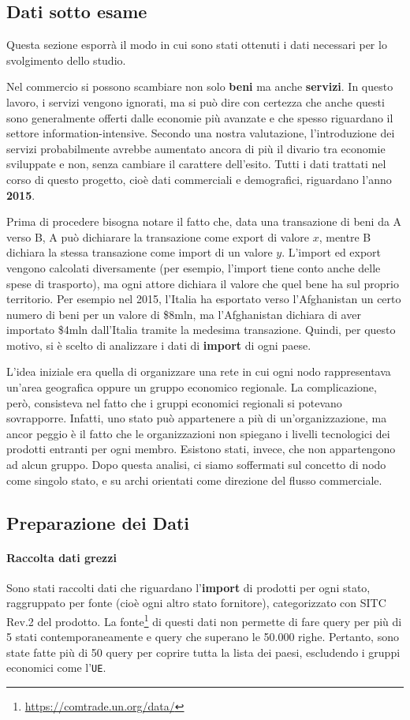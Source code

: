 \documentclass[]{article}
\begin{document}
\begin{multicols}{2}
	\section{Dati sotto esame}
	Questa sezione esporrà il modo in cui sono stati ottenuti i dati necessari per lo svolgimento dello studio.
	
	Nel commercio si possono scambiare non solo \textbf{beni} ma anche \textbf{servizi}. In questo lavoro, i servizi vengono ignorati, ma si può dire con certezza che anche questi sono generalmente offerti dalle economie più avanzate e che spesso riguardano il settore information-intensive. Secondo una nostra valutazione, l'introduzione dei servizi probabilmente avrebbe aumentato ancora di più il divario tra economie sviluppate e non, senza cambiare il carattere dell'esito. Tutti i dati trattati nel corso di questo progetto, cioè dati commerciali e demografici, riguardano l'anno \textbf{2015}.
	
	Prima di procedere bisogna notare il fatto che, data una transazione di beni da A verso B, A può dichiarare la transazione come export di valore $x$, mentre B dichiara la stessa transazione come import di un valore $y$. L'import ed export vengono calcolati diversamente (per esempio, l'import tiene conto anche delle spese di trasporto), ma ogni attore dichiara il valore che quel bene ha sul proprio territorio. Per esempio nel 2015, l'Italia ha esportato verso l'Afghanistan un certo numero di beni per un valore di \$8mln, ma l'Afghanistan dichiara di aver importato \$4mln dall'Italia tramite la medesima transazione. Quindi, per questo motivo, si è scelto di analizzare i dati di \textbf{import} di ogni paese.

	L'idea iniziale era quella di organizzare una rete in cui ogni nodo rappresentava un'area geografica oppure un gruppo economico regionale. La complicazione, però, consisteva nel fatto che i gruppi economici regionali si potevano sovrapporre. Infatti, uno stato può appartenere a più di un'organizzazione, ma ancor peggio è il fatto che le organizzazioni non spiegano i livelli tecnologici dei prodotti entranti per ogni membro. Esistono stati, invece, che non appartengono ad alcun gruppo. Dopo questa analisi, ci siamo soffermati sul concetto di nodo come singolo stato, e su archi orientati come direzione del flusso commerciale.
	\subsection{Preparazione dei Dati}	
	\paragraph{Raccolta dati grezzi} Sono stati raccolti dati che riguardano l'\textbf{import} di prodotti per ogni stato, raggruppato per fonte (cioè ogni altro stato fornitore), categorizzato con SITC Rev.2 del prodotto. La fonte\footnote{\url{https://comtrade.un.org/data/}} di questi dati non permette di fare query per più di 5 stati contemporaneamente e query che superano le 50.000 righe. Pertanto, sono state fatte più di 50 query per coprire tutta la lista dei paesi, escludendo i gruppi economici come l'\texttt{UE}.
	

\end{multicols}
\end{document}

